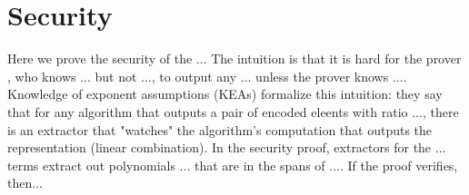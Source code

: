 \documentclass[lnbip]{svmultln}
\begin{document}
\section{Security}
Here we prove the security of the ...
The intuition is that it is hard for the prover , who knows ... but not ..., to output any ... unless the prover knows .... Knowledge of exponent assumptions (KEAs) formalize this intuition: they say that for any algorithm that outputs a pair of encoded eleents with ratio ..., there is an extractor that "watches" the algorithm's computation that outputs the representation (linear combination). In the security proof, extractors for the ... terms extract out polynomials ... that are in the spans of .... If the proof verifies, then... 







\end{document}
